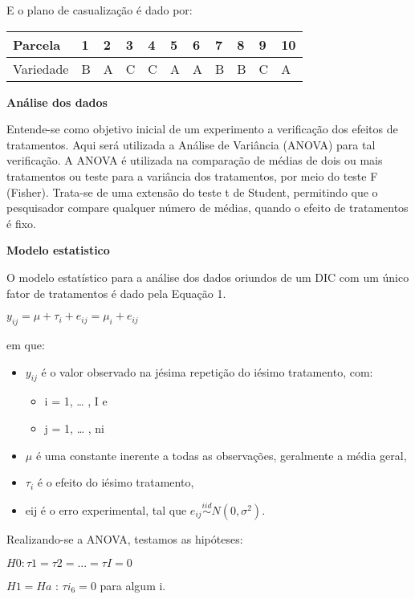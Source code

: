 \documentclass[
]{book}
\providecommand{\tightlist}{%
  \setlength{\itemsep}{0pt}\setlength{\parskip}{0pt}}
\begin{document}
E o plano de casualização é dado por:

\begin{longtable}[]{@{}lllllllllll@{}}
\toprule()
Parcela & 1 & 2 & 3 & 4 & 5 & 6 & 7 & 8 & 9 & 10 \\
\midrule()
\endhead
Variedade & B & A & C & C & A & A & B & B & C & A \\
\bottomrule()
\end{longtable}

\textbf{Análise dos dados}

Entende-se como objetivo inicial de um experimento a verificação dos efeitos de tratamentos. Aqui será utilizada a Análise de Variância (ANOVA) para tal verificação. A ANOVA é utilizada na comparação de médias de dois ou mais tratamentos ou teste para a variância dos tratamentos, por meio do teste F (Fisher). Trata-se de uma extensão do teste t de Student, permitindo que o pesquisador compare qualquer número de médias, quando o efeito de tratamentos é fixo.

\textbf{Modelo estatistico}

O modelo estatístico para a análise dos dados oriundos de um DIC com um único fator de tratamentos é dado pela Equação 1.

\(y_{ij} = \mu + \tau_i + e_{ij} = \mu_i + e_{ij}\)

em que:

\begin{itemize}
\item
  \(y_{ij}\) é o valor observado na jésima repetição do iésimo tratamento, com:

  \begin{itemize}
  \tightlist
  \item
    i = 1, \ldots{} , I e
  \item
    j = 1, \ldots{} , ni
  \end{itemize}
\item
  \(\mu\) é uma constante inerente a todas as observações, geralmente a média geral,
\item
  \(\tau_i\) é o efeito do iésimo tratamento,
\item
  eij é o erro experimental, tal que \(e_{ij} \overset{iid}{\sim} N(0,\sigma^2)\).
\end{itemize}

Realizando-se a ANOVA, testamos as hipóteses:

\(H0 : \tau1 = \tau2 = ... = \tau I = 0\)

\(H1 = Ha\) : \(\tau i_6 = 0\) para algum i.
\end{document}
